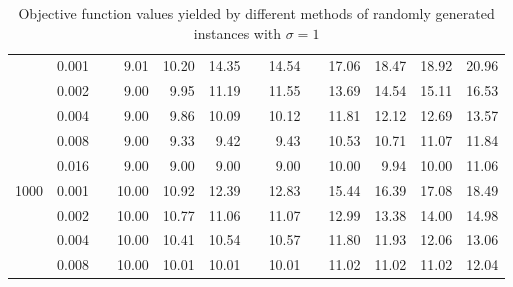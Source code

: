 \begin{table}[]
\begin{tabular}{ccrrrrrrrrrrr}
& 0.001 && 9.01 & 10.20 & 14.35 && 14.54 && 17.06 & 18.47 & 18.92 & 20.96 \\
& 0.002 && 9.00 & 9.95  & 11.19 && 11.55 && 13.69 & 14.54 & 15.11 & 16.53 \\
& 0.004 && 9.00 & 9.86  & 10.09 && 10.12 && 11.81 & 12.12 & 12.69 & 13.57 \\
& 0.008 && 9.00 & 9.33  & 9.42  && 9.43  && 10.53 & 10.71 & 11.07 & 11.84 \\
& 0.016 && 9.00 & 9.00  & 9.00  && 9.00  && 10.00 & 9.94  & 10.00 & 11.06 \\
\hline
\multirow{5}{*}{1000} 
& 0.001 && 10.00 & 10.92 & 12.39 && 12.83 && 15.44 & 16.39 & 17.08 & 18.49 \\
& 0.002 && 10.00 & 10.77 & 11.06 && 11.07 && 12.99 & 13.38 & 14.00 & 14.98 \\
& 0.004 && 10.00 & 10.41 & 10.54 && 10.57 && 11.80 & 11.93 & 12.06 & 13.06 \\
& 0.008 && 10.00 & 10.01 & 10.01 && 10.01 && 11.02 & 11.02 & 11.02 & 12.04 \\
\end{tabular}                              
\caption{Objective function values yielded by different methods of randomly generated instances with $\sigma=1$}
\label{tab:obj-s1}
\end{table}

